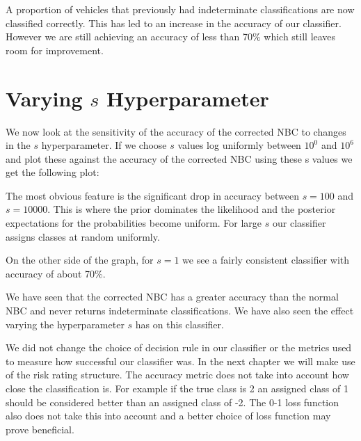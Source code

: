 A proportion of vehicles that previously had indeterminate classifications are now classified correctly.
This has led to an increase in the accuracy of our classifier.
However we are still achieving an accuracy of less than 70\% which still leaves room for improvement.

\section{Varying $s$ Hyperparameter}

We now look at the sensitivity of the accuracy of the corrected NBC to changes in the $s$ hyperparameter.
If we choose $s$ values log uniformly between $10^{0}$ and $10^{6}$ and plot these against the accuracy of the corrected NBC using these s values we get the following plot:
\begin{center}
\end{center}

The most obvious feature is the significant drop in accuracy between $s=100$ and $s=10000$.
This is where the prior dominates the likelihood and the posterior expectations for the probabilities become uniform.
For large $s$ our classifier assigns classes at random uniformly.

On the other side of the graph, for $s=1$ we see a fairly consistent classifier with accuracy of about 70\%.

We have seen that the corrected NBC has a greater accuracy than the normal NBC and never returns indeterminate classifications.
We have also seen the effect varying the hyperparameter $s$ has on this classifier.

We did not change the choice of decision rule in our classifier or the metrics used to measure how successful our classifier was.
In the next chapter we will make use of the risk rating structure.
The accuracy metric does not take into account how close the classification is.
For example if the true class is 2 an assigned class of 1 should be considered better than an assigned class of -2.
The 0-1 loss function also does not take this into account and a better choice of loss function may prove beneficial.